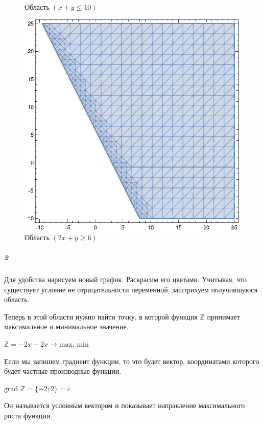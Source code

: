 \begin{figure}[!htb]
\begin{minipage}{0.32\textwidth}
    \caption{Область $(x+y\leq 10)$}

    \label{fig:2}
  \end{minipage}
  \begin{minipage}{0.32\textwidth}
    \centering

    \includegraphics[width=0.99\textwidth]
    {inc/3.eps}
  
    \caption{Область $(2x+y\geq 6)$}

    \label{fig:3}
  \end{minipage}
\end{figure}

\subparagraph{2}
Для удобства нарисуем новый график.
Раскрасим его цветами.
Учитывая, что существует условие не отрицательности переменной,
заштрихуем получившуюся область.

Теперь в этой области нужно найти точку,
в которой функция $\mathbb{Z}$ принимает максимальное и минимальное значение.

$\mathbb{Z} =-2x+2x \to \text{max, min}$

Если мы запишем градиент функции, то это будет вектор, координатами которого будет частные производные функции.

$\text{grad }\mathbb{Z} = \{-2; 2\} = \bar{c}$

Он называется условным вектором и показывает направление максимального роста функции.

